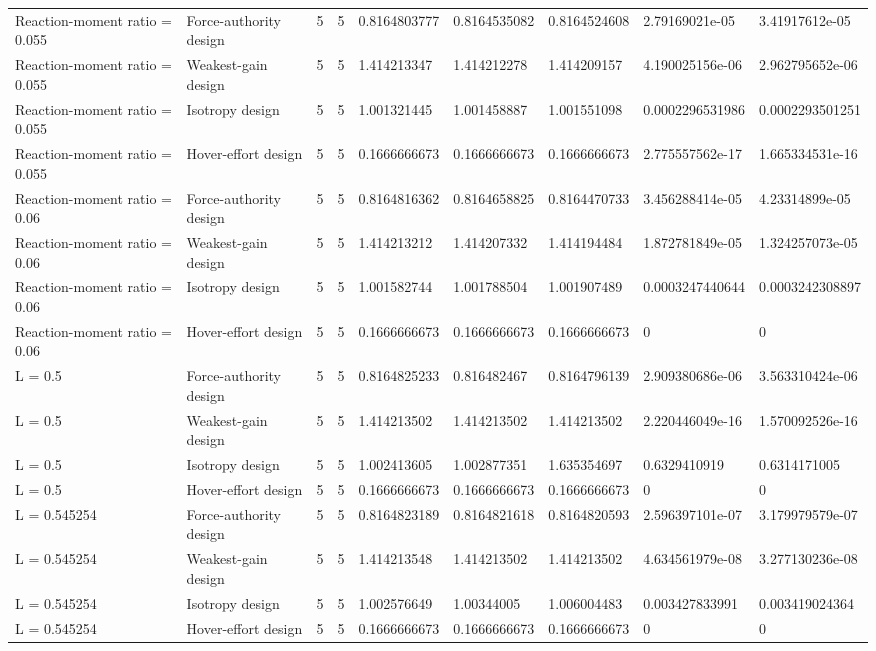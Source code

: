 \begin{tabular}{@{}lllllllll@{}}
Reaction-moment ratio = 0.055 & Force-authority design & 5 & 5 & 0.8164803777 & 0.8164535082 & 0.8164524608 & 2.79169021e-05 & 3.41917612e-05 \\
Reaction-moment ratio = 0.055 & Weakest-gain design & 5 & 5 & 1.414213347 & 1.414212278 & 1.414209157 & 4.190025156e-06 & 2.962795652e-06 \\
Reaction-moment ratio = 0.055 & Isotropy design & 5 & 5 & 1.001321445 & 1.001458887 & 1.001551098 & 0.0002296531986 & 0.0002293501251 \\
Reaction-moment ratio = 0.055 & Hover-effort design & 5 & 5 & 0.1666666673 & 0.1666666673 & 0.1666666673 & 2.775557562e-17 & 1.665334531e-16 \\
Reaction-moment ratio = 0.06 & Force-authority design & 5 & 5 & 0.8164816362 & 0.8164658825 & 0.8164470733 & 3.456288414e-05 & 4.23314899e-05 \\
Reaction-moment ratio = 0.06 & Weakest-gain design & 5 & 5 & 1.414213212 & 1.414207332 & 1.414194484 & 1.872781849e-05 & 1.324257073e-05 \\
Reaction-moment ratio = 0.06 & Isotropy design & 5 & 5 & 1.001582744 & 1.001788504 & 1.001907489 & 0.0003247440644 & 0.0003242308897 \\
Reaction-moment ratio = 0.06 & Hover-effort design & 5 & 5 & 0.1666666673 & 0.1666666673 & 0.1666666673 & 0 & 0 \\
L = 0.5 & Force-authority design & 5 & 5 & 0.8164825233 & 0.816482467 & 0.8164796139 & 2.909380686e-06 & 3.563310424e-06 \\
L = 0.5 & Weakest-gain design & 5 & 5 & 1.414213502 & 1.414213502 & 1.414213502 & 2.220446049e-16 & 1.570092526e-16 \\
L = 0.5 & Isotropy design & 5 & 5 & 1.002413605 & 1.002877351 & 1.635354697 & 0.6329410919 & 0.6314171005 \\
L = 0.5 & Hover-effort design & 5 & 5 & 0.1666666673 & 0.1666666673 & 0.1666666673 & 0 & 0 \\
L = 0.545254 & Force-authority design & 5 & 5 & 0.8164823189 & 0.8164821618 & 0.8164820593 & 2.596397101e-07 & 3.179979579e-07 \\
L = 0.545254 & Weakest-gain design & 5 & 5 & 1.414213548 & 1.414213502 & 1.414213502 & 4.634561979e-08 & 3.277130236e-08 \\
L = 0.545254 & Isotropy design & 5 & 5 & 1.002576649 & 1.00344005 & 1.006004483 & 0.003427833991 & 0.003419024364 \\
L = 0.545254 & Hover-effort design & 5 & 5 & 0.1666666673 & 0.1666666673 & 0.1666666673 & 0 & 0 \\

\end{tabular}

